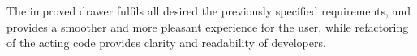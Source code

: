 The improved drawer fulfils all desired the previously specified requirements, and provides a smoother and more pleasant experience for the user, while refactoring of the acting code provides clarity and readability of developers.


